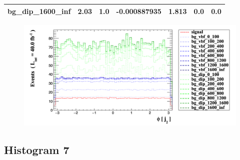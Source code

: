\documentclass[a4paper, 10pt]{article}
\begin{document}
\begin{table}[H]
\begin{center}
\begin{tabular}{|m{23.0mm}|m{23.0mm}|m{18.0mm}|m{19.0mm}|m{19.0mm}|m{19.0mm}|m{19.0mm}|}
      \hline
      {\cellcolor{white}         bg\_dip\_1600\_inf}& {\cellcolor{white}         2.03}& {\cellcolor{white}         1.0}& {\cellcolor{white}         -0.000887935}& {\cellcolor{white}         1.813}& {\cellcolor{green}         0.0}& {\cellcolor{green}         0.0}\\
\hline
    \end{tabular}
  \end{center}
\end{table}

\begin{figure}[H]
  \begin{center}
    \includegraphics[scale=0.45]{selection_5.png}\\
\caption{   }
  \end{center}
\end{figure}
      \newpage
\subsection{ Histogram 7}
\end{document}
